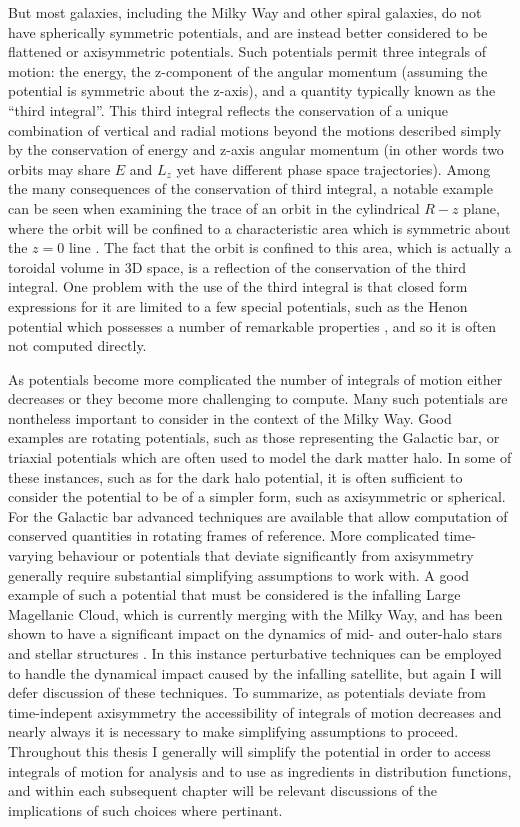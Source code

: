 But most galaxies, including the Milky Way and other spiral galaxies, do not have spherically symmetric potentials, and are instead better considered to be flattened or axisymmetric potentials. Such potentials permit three integrals of motion: the energy, the z-component of the angular momentum (assuming the potential is symmetric about the z-axis), and a quantity typically known as the ``third integral''. This third integral reflects the conservation of a unique combination of vertical and radial motions beyond the motions described simply by the conservation of energy and z-axis angular momentum (in other words two orbits may share $E$ and $L_{z}$ yet have different phase space trajectories). Among the many consequences of the conservation of third integral, a notable example can be seen when examining the trace of an orbit in the cylindrical $R-z$ plane, where the orbit will be confined to a characteristic area which is symmetric about the $z=0$ line \parencite[see figure 3.4 in][]{binney08}. The fact that the orbit is confined to this area, which is actually a toroidal volume in 3D space, is a reflection of the conservation of the third integral. One problem with the use of the third integral is that closed form expressions for it are limited to a few special potentials, such as the Henon potential which possesses a number of remarkable properties \parencite{henon59a,binney14e}, and so it is often not computed directly.

As potentials become more complicated the number of integrals of motion either decreases or they become more challenging to compute. Many such potentials are nontheless important to consider in the context of the Milky Way. Good examples are rotating potentials, such as those representing the Galactic bar, or triaxial potentials which are often used to model the dark matter halo. In some of these instances, such as for the dark halo potential, it is often sufficient to consider the potential to be of a simpler form, such as axisymmetric or spherical. For the Galactic bar advanced techniques are available that allow computation of conserved quantities in rotating frames of reference. More complicated time-varying behaviour or potentials that deviate significantly from axisymmetry generally require substantial simplifying assumptions to work with. A good example of such a potential that must be considered is the infalling Large Magellanic Cloud, which is currently merging with the Milky Way, and has been shown to have a significant impact on the dynamics of mid- and outer-halo stars and stellar structures \parencite[e.g.][]{erkal19}. In this instance perturbative techniques can be employed to handle the dynamical impact caused by the infalling satellite, but again I will defer discussion of these techniques. To summarize, as potentials deviate from time-indepent axisymmetry the accessibility of integrals of motion decreases and nearly always it is necessary to make simplifying assumptions to proceed. Throughout this thesis I generally will simplify the potential in order to access integrals of motion for analysis and to use as ingredients in distribution functions, and within each subsequent chapter will be relevant discussions of the implications of such choices where pertinant.

